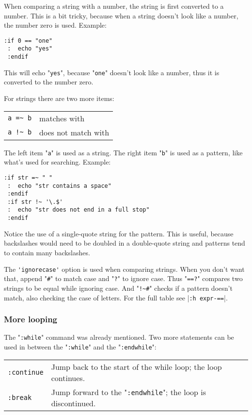 When comparing a string with a number, the string is first converted to a number.
This is a bit tricky, because when a string doesn't look like a number, the number zero is used.
Example:

\begin{Verbatim}[samepage=true]
 :if 0 == "one"
 :  echo "yes"
 :endif
\end{Verbatim}

This will echo "\verb!yes!", because "\verb!one!" doesn't look like a number, thus it is converted to the number zero.

For strings there are two more items:
\begin{center} \begin{tabular}{c l}
				\verb;a =~ b; & matches with \\
				\verb;a !~ b; & does not match with \\
\end{tabular} \end{center}

The left item "\verb!a!" is used as a string.
The right item "\verb!b!" is used as a pattern, like what's used for searching.
Example:

\begin{Verbatim}[samepage=true]
 :if str =~ " "
 :  echo "str contains a space"
 :endif
 :if str !~ '\.$'
 :  echo "str does not end in a full stop"
 :endif
\end{Verbatim}

Notice the use of a single-quote string for the pattern.
This is useful, because backslashes would need to be doubled in a double-quote string and patterns tend to contain many backslashes.

The \verb!'ignorecase'! option is used when comparing strings.
When you don't want that, append "\verb!#!" to match case and "\verb!?!" to ignore case.
Thus "\verb!==?!" compares two strings to be equal while ignoring case.
And "\verb:!~#:" checks if a pattern doesn't match, also checking the case of letters.
For the full table see |\verb!:h expr-==!|.
\subsubsection{More looping}
The "\verb!:while!" command was already mentioned.
Two more statements can be used in between the "\verb!:while!" and the "\verb!:endwhile!":

\begin{center} \begin{tabular}{l l}
				\verb!:continue! & Jump back to the start of the while loop; the loop continues. \\
				\verb!:break! & Jump forward to the "\verb!:endwhile!"; the loop is discontinued. \\
\end{tabular} \end{center}

